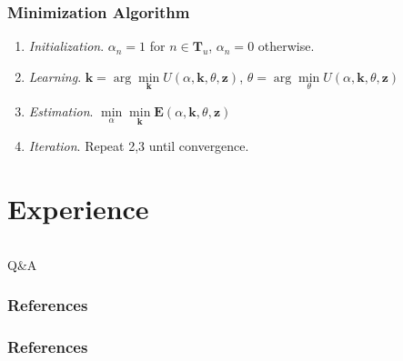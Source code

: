 \documentclass[compress]{beamer} %
\newcommand{\bfE}{\mathbf{E}}
\newcommand{\bfz}{\mathbf{z}}
\begin{document}
 \begin{frame}
  \frametitle{Minimization Algorithm}
  \begin{enumerate}
   \item \textit{Initialization}. $\alpha_n=1$ for $n\in \mathbf{T}_u$, $\alpha_n=0$ otherwise.
   \item \textit{Learning}. $\mathbf{k}=\arg\min\limits_{\mathbf{k}} U(\alpha,\mathbf{k},\theta,\bfz)$, $\theta=\arg\min\limits_{\theta} U(\alpha,\mathbf{k},\theta,\bfz)$
   \item \textit{Estimation}. $\min\limits_{\alpha}\min\limits_{\mathbf{k}}\bfE(\alpha,\mathbf{k},\theta,\bfz) $
   \item \textit{Iteration}. Repeat 2,3 until convergence.
  \end{enumerate}

 \end{frame}
 
 \section{Experience}
  \begin{frame}
   {\Huge
     \vspace {0.15\textwidth}
     \begin{columns}
       \begin{column}{0.3\textwidth}
       \end{column}
       \begin{column}{0.3\textwidth}
       \end{column}
       \begin{column}{0.3\textwidth}
       \end{column}
     \end{columns}
   }
   \vspace {0.025\textwidth}
   \begin{center}
   {\huge Q\&A}
   \end{center}
 \end{frame}

\begin{frame}\frametitle{References}
\frametitle{References}


\end{frame}
\end{document}
